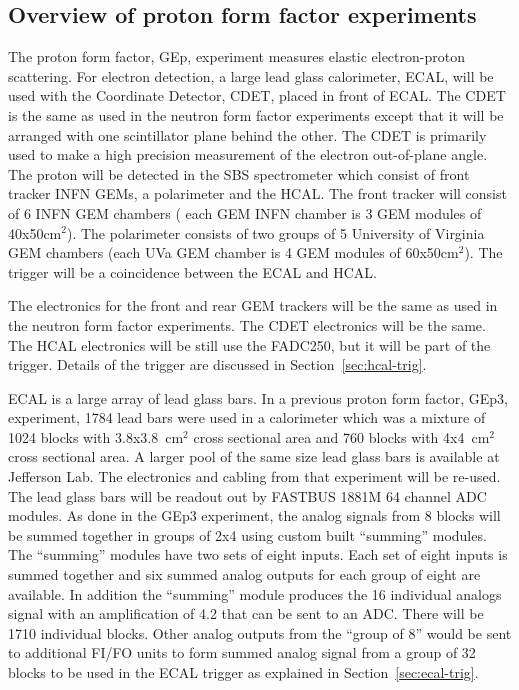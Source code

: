 \documentclass[]{article}
\begin{document}
 
 
 \subsection{Overview of proton form factor experiments}
 \label{sec:over-pff}
 The proton form factor, GEp, experiment measures elastic electron-proton scattering. For electron
 detection, a large lead glass calorimeter, ECAL,  will be used with the Coordinate Detector, CDET, placed in front
 of ECAL. The CDET is the same as used in the neutron form factor experiments except
 that it will be arranged with one scintillator plane behind the other. The CDET is primarily used
 to make a high precision measurement of the electron out-of-plane angle. The proton will be
 detected in the SBS spectrometer which consist of front tracker INFN GEMs, a polarimeter and the HCAL.
 The front tracker will consist of 6 INFN GEM chambers ( each GEM INFN chamber is 3 GEM modules of 40x50cm$^2$).
 The polarimeter consists of two groups of 5 University of Virginia GEM chambers (each UVa GEM chamber
 is 4 GEM modules of 60x50cm$^2$). The trigger will be a coincidence between the ECAL and HCAL.
 
 The electronics for the front and rear GEM trackers will be the same as used in the neutron form factor 
 experiments. The CDET electronics will be the same. The HCAL electronics will be still use the FADC250, but it will be part of the trigger. Details of the trigger are discussed in Section~\ref{sec:hcal-trig}.
 
 ECAL is a large array of lead glass bars. In a previous proton form factor, GEp3,  experiment, 1784 lead bars
 were used in a calorimeter which was a mixture of 1024 blocks with 3.8x3.8~cm$^2$ cross sectional area and
 760 blocks with 4x4~cm$^2$ cross sectional area. A larger pool of the same size lead glass bars is 
 available at Jefferson Lab.
 The electronics and cabling from that experiment will be re-used. The 
 lead glass bars will be readout out by  FASTBUS 1881M 64 channel ADC modules. As done in the GEp3 experiment,
 the analog signals from 8 blocks will be summed together in groups of 2x4 using custom built ``summing'' modules.
 The ``summing'' modules have two sets of eight inputs. Each set of eight inputs is summed together
 and six summed analog outputs for each group of eight are available. In addition the ``summing'' module 
 produces the 16 individual
 analogs signal with an amplification of 4.2 that can be sent to an ADC. There will be 1710 individual blocks.
  Other analog outputs from the  ``group of 8'' would be sent to additional
 FI/FO units to form summed analog signal from a group of 32 blocks to be used in the ECAL trigger as
 explained in Section~\ref{sec:ecal-trig}.
 
\end{document}

